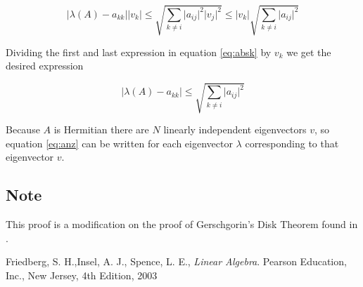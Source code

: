 \documentclass[aps,prl,groupedaddress]{revtex4}
\begin{document}
\begin{equation}
\label{eq:absk}
\lvert \lambda (A) - a_{kk} \rvert \lvert v_{k} \rvert  \leq \sqrt{\sum_{k \neq i} \lvert a_{ij} \rvert^2 \lvert v_{j} \rvert^2} \leq \lvert v_{k} \rvert \sqrt{\sum_{k \neq i} \lvert a_{ij} \rvert^2}
\end{equation}

Dividing the first and last expression in equation \ref{eq:absk} by $v_{k}$ we get the desired expression

\begin{equation}
\label{eq:anz}
\lvert \lambda (A) - a_{kk} \rvert \leq \sqrt{\sum_{k \neq i} \lvert a_{ij} \rvert^2}
\end{equation}

Because $A$ is Hermitian there are $N$ linearly independent eigenvectors $v$, so equation \ref{eq:anz} can be written for each eigenvector $\lambda$ corresponding to that eigenvector $v$.

\subsection{Note}
This proof is a modification on the proof of Gerschgorin's Disk Theorem found in \cite[p.~297]{ref}.

\begin{thebibliography}{1}

 Friedberg, S. H.,Insel, A. J., Spence, L. E., 
 \emph{Linear Algebra}.
  Pearson Education, Inc., New Jersey,
  4th Edition,
  2003



\end{thebibliography}
\end{document}
